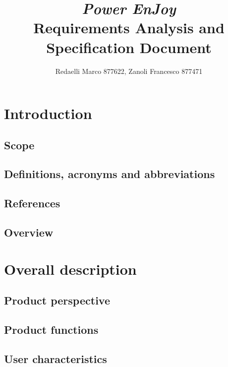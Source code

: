 \documentclass[]{report}
\title{{\Huge\textit{Power EnJoy}}\\{\LARGE Requirements Analysis and Specification Document}}
\author{Redaelli Marco 877622, Zanoli Francesco 877471}
\begin{document}
\maketitle

\tableofcontents

\listoffigures
\chapter{Introduction}



\section{Scope}


\section{Definitions, acronyms and abbreviations}


\section{References}


\section{Overview}


\chapter{Overall description}

\section{Product perspective}

\section{Product functions}


\section{User characteristics}
\end{document}
